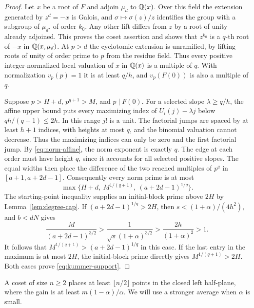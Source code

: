 \begin{proof}
Let \(x\) be a root of \(F\) and adjoin \(\mu_d\) to \(\mathbb Q(x)\).
Over this field the extension generated by \(z^d=-x\) is Galois,
and \(\sigma\mapsto\sigma(z)/z\) identifies the group with a
subgroup of \(\mu_d\), of order \(k_0\). Any other lift differs
from \(z\) by a root of unity already adjoined. This proves
the coset assertion and shows that \(z^{k_0}\) is a
\(q\)-th root of \(-x\) in \(\mathbb Q(x,\mu_d)\).
At \(p>d\) the cyclotomic extension is unramified, by lifting
roots of unity of order prime to \(p\) from the residue field.
Thus every positive integer-normalized local valuation of \(x\)
in \(\mathbb Q(x)\) is a multiple of \(q\). With normalization
\(v_p(p)=1\) it is at least \(q/h\), and \(v_p(F(0))\) is
also a multiple of \(q\).

Suppose \(p>H+d\), \(p^{q+1}>M\), and \(p\mid F(0)\).
For a selected slope \(\lambda\ge q/h\), the affine
upper bound puts every maximizing index of \(U_i(j)-\lambda j\)
below \(qh/(q-1)\le2h\). In this range \(j! \) is a unit.
The factorial jumps are spaced by at least \(h+1\) indices,
with heights at most \(q\), and the binomial valuation cannot
decrease. Thus the maximizing indices can only be zero and
the first factorial jump. By \eqref{eq:norm-affine}, the norm
exponent is exactly \(q\). The edge at each order must have
height \(q\), since it accounts for all selected positive slopes.
The equal widths then place the difference of the two reached
multiples of \(p^q\) in \([a+1,a+2d-1]\). Consequently every norm
prime is at most
\[
 \max\{H+d,\ M^{1/(q+1)},\ (a+2d-1)^{1/q}\}.
\]
The starting-point inequality supplies an initial-block prime
above \(2H\) by Lemma~\ref{lem:degree-cap}. If
\((a+2d-1)^{1/q}>2H\), then
\(s<(1+\alpha)/(4h^2)\), and \(b<dN\) gives
\[
 \frac{M}{(a+2d-1)^{3/2}}>
 \frac{1}{\sqrt s(1+\alpha)^{3/2}}>
 \frac{2h}{(1+\alpha)^2}>1.
\]
It follows that \(M^{1/(q+1)}>(a+2d-1)^{1/q}\) in this case.
If the last entry in the maximum is at most \(2H\), the
initial-block prime directly gives \(M^{1/(q+1)}>2H\).
Both cases prove \eqref{eq:kummer-support}.
\end{proof}

A coset of size \(n\ge2\) places at least \(\lfloor n/2\rfloor\)
points in the closed left half-plane, where the gain is at
least \(m(1-\alpha)/\alpha\). We will use a stronger average
when \(\alpha\) is small.

